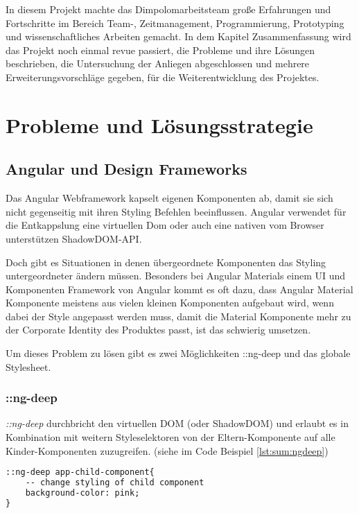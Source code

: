 In diesem Projekt machte das Dimpolomarbeitsteam große Erfahrungen und Fortschritte im Bereich Team-, Zeitmanagement, Programmierung, Prototyping und wissenschaftliches Arbeiten gemacht. In dem Kapitel Zusammenfassung wird das Projekt noch einmal revue passiert, die Probleme und ihre Lösungen beschrieben, die Untersuchung der Anliegen abgeschlossen und mehrere Erweiterungsvorschläge gegeben, für die Weiterentwicklung des Projektes. 

\section{Probleme und Lösungsstrategie}
\subsection{Angular und Design Frameworks}
Das Angular Webframework kapselt eigenen Komponenten ab, damit sie sich nicht gegenseitig mit ihren Styling Befehlen beeinflussen. Angular verwendet für die Entkappslung eine virtuellen Dom oder auch eine nativen vom Browser unterstützen ShadowDOM-API. 
\cite{AngularViewencapsulation}


Doch gibt es Situationen in denen übergeordnete Komponenten das Styling untergeordneter ändern müssen. Besonders bei Angular Materials einem UI und Komponenten Framework von Angular kommt es oft dazu, dass Angular Material Komponente meistens aus vielen kleinen Komponenten aufgebaut wird, wenn dabei der Style angepasst werden muss, damit die Material Komponente mehr zu der Corporate Identity des Produktes passt, ist das schwierig umsetzen. 

Um dieses Problem zu lösen gibt es zwei Möglichkeiten ::ng-deep und das globale Stylesheet. 

\subsubsection{::ng-deep}
\emph{::ng-deep} durchbricht den virtuellen DOM (oder ShadowDOM) und erlaubt es in Kombination mit weitern Styleselektoren von der Eltern-Komponente auf alle Kinder-Komponenten zuzugreifen. (siehe im Code Beispiel \ref{lst:sum:ngdeep})

\begin{lstlisting}[caption={{Parent.component.scss - Changing Styling in Child Componentes by using :ngdeep}},language=HTML,label=lst:sum:ngdeep]
::ng-deep app-child-component{
    -- change styling of child component
    background-color: pink;
}    
\end{lstlisting}

